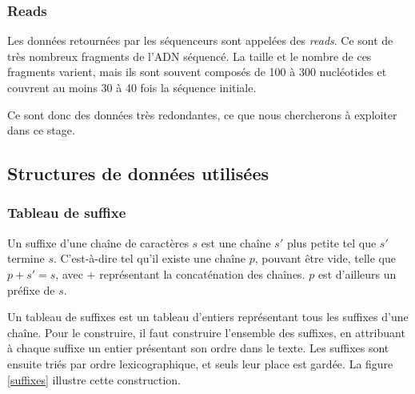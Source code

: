 \subsubsection{Reads}
Les données retournées par les séquenceurs sont appelées des \emph{reads}. Ce sont de très nombreux fragments de l'ADN séquencé. La taille et le nombre de ces fragments varient, mais ils sont souvent composés de 100 à 300 nucléotides et couvrent au moins 30 à 40 fois la séquence initiale. 

Ce sont donc des données très redondantes, ce que nous chercherons à exploiter dans ce stage.


\subsection{Structures de données utilisées}

\subsubsection{Tableau de suffixe}
Un suffixe d'une chaîne de caractères $s$ est une chaîne $s'$ plus petite tel que $s'$ termine $s$. C'est-à-dire tel qu'il existe une chaîne $p$, pouvant être vide, telle que $p + s' = s$, avec $+$ représentant la concaténation des chaînes. $p$ est d'ailleurs un préfixe de $s$.

Un tableau de suffixes est un tableau d'entiers représentant tous les suffixes d'une chaîne. Pour le construire, il faut construire l'ensemble des suffixes, en attribuant à chaque suffixe un entier présentant son ordre dans le texte. Les suffixes sont ensuite triés par ordre lexicographique, et seuls leur place est gardée. La figure \ref{suffixes} illustre cette construction.

